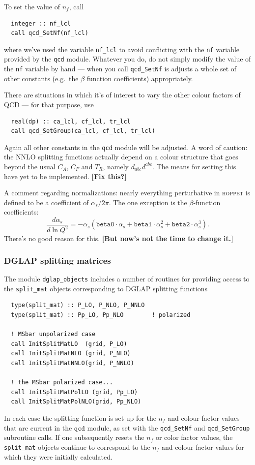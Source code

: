 \documentclass[12pt]{article}
\newcommand{\as}{\alpha_s}
\newcommand{\comment}[1]{\textbf{[#1]}}
\newcommand{\eg}{e.g.\ }
\newcommand{\hoppet}{\textsc{hoppet}\xspace}
\newcommand{\ttt}[1]{\texttt{#1}}
\begin{document}
To set the value of $n_f$, call
\begin{verbatim}
  integer :: nf_lcl
  call qcd_SetNf(nf_lcl)  
\end{verbatim}
where we've used the variable \ttt{nf\_lcl} to avoid conflicting with
the \ttt{nf} variable provided by the \ttt{qcd} module. Whatever you
do, do not simply modify the value of the \ttt{nf} variable by hand
--- when you call \ttt{qcd\_SetNf} is adjusts a whole set of other
constants (\eg the $\beta$ function coefficients) appropriately.

There are situations in which it's of interest to vary the other
colour factors of QCD --- for that purpose, use
\begin{verbatim}
  real(dp) :: ca_lcl, cf_lcl, tr_lcl
  call qcd_SetGroup(ca_lcl, cf_lcl, tr_lcl)
\end{verbatim}
Again all other constants in the \ttt{qcd} module will be adjusted. A
word of caution: the NNLO splitting functions actually depend on a
colour structure that goes beyond the usual $C_A$, $C_F$ and $T_R$,
namely $d_{abc}d^{abc}$. The means for setting this have yet to be
implemented. \comment{Fix this?}


A comment regarding normalizations: nearly everything perturbative in
\hoppet is defined to be a coefficient of $\as/2\pi$. The one
exception is the $\beta$-function coefficients:
\begin{equation}
  \label{eq:as-ev}
  \frac{d\as}{d\ln Q^2} = -\as (\ttt{beta0}\cdot \as +
  \ttt{beta1}\cdot \as^2 + 
  \ttt{beta2} \cdot\as^3).
\end{equation}
There's no good reason for this. \comment{But now's not the time to
  change it.}

\subsubsection{DGLAP splitting matrices}
\label{sec:dglap-split}

The module \ttt{dglap\_objects} includes a number of routines for
providing access to the \ttt{split\_mat} objects corresponding to
DGLAP splitting functions
\begin{verbatim}
  type(split_mat) :: P_LO, P_NLO, P_NNLO
  type(split_mat) :: Pp_LO, Pp_NLO        ! polarized

  ! MSbar unpolarized case
  call InitSplitMatLO  (grid, P_LO)
  call InitSplitMatNLO (grid, P_NLO)
  call InitSplitMatNNLO(grid, P_NNLO)

  ! the MSbar polarized case...
  call InitSplitMatPolLO (grid, Pp_LO)
  call InitSplitMatPolNLO(grid, Pp_NLO)
\end{verbatim}
In each case the splitting function is set up for the $n_f$ and
colour-factor values that are current in the $\ttt{qcd}$ module, as
set with the \ttt{qcd\_SetNf} and \ttt{qcd\_SetGroup} subroutine calls. If one
subsequently resets the $n_f$ or color factor values, the \ttt{split\_mat}
objects continue to correspond to the $n_f$ and colour factor values
for which they were initially calculated.
\end{document}
